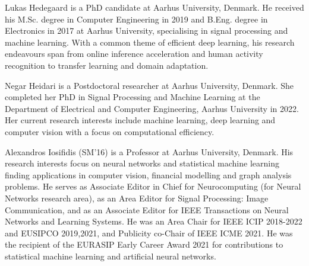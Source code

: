 \documentclass[journal]{IEEEtran}
\theoremstyle{definition}
\begin{document}
\begin{IEEEbiography}{Lukas Hedegaard}
is a PhD candidate at Aarhus University, Denmark. He received his M.Sc. degree in Computer Engineering in 2019 and B.Eng. degree in Electronics in 2017 at Aarhus University, specialising in signal processing and machine learning. With a common theme of efficient deep learning, his research endeavours span from online inference acceleration and human activity recognition to transfer learning and domain adaptation.
\end{IEEEbiography}



\begin{IEEEbiography}{Negar Heidari}
is a Postdoctoral researcher at Aarhus University, Denmark. She completed her PhD in Signal Processing and Machine Learning at the Department of Electrical and Computer Engineering, Aarhus University in 2022. Her current research interests include machine learning, deep learning and computer vision with a focus on computational efficiency. 

\end{IEEEbiography}


\begin{IEEEbiography}{Alexandros Iosifidis}
(SM'16) is a Professor at Aarhus University, Denmark. His research interests focus on neural networks and statistical machine learning finding applications in computer vision, financial modelling and graph analysis problems. He serves as Associate Editor in Chief for Neurocomputing (for Neural Networks research area), as an Area Editor for Signal Processing: Image Communication, and as an Associate Editor for IEEE Transactions on Neural Networks and Learning Systems. He was an Area Chair for IEEE ICIP 2018-2022 and EUSIPCO 2019,2021, and Publicity co-Chair of IEEE ICME 2021. He was the recipient of the EURASIP Early Career Award 2021 for contributions to statistical machine learning and artificial neural networks. \end{IEEEbiography}

\vfill





%
 
\end{document}
